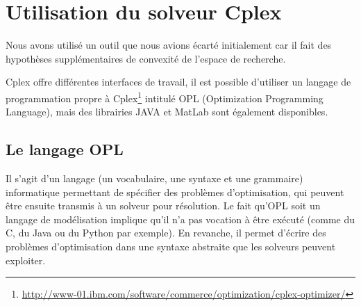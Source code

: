 											
\section[Cplex]{Utilisation du solveur Cplex}

Nous avons utilisé un outil que nous avions écarté initialement car il fait des hypothèses supplémentaires de convexité de l'espace de recherche.

Cplex offre différentes interfaces de travail, il est possible d'utiliser un langage de programmation propre à Cplex\footnote{\url{http://www-01.ibm.com/software/commerce/optimization/cplex-optimizer/}} intitulé OPL (Optimization Programming Language), mais des librairies JAVA et MatLab sont également disponibles.

\subsection{Le langage OPL}
 Il s'agit d'un langage (un vocabulaire, une syntaxe et une grammaire) informatique permettant de spécifier des problèmes d'optimisation, qui peuvent être ensuite transmis à un solveur pour résolution. Le fait qu'OPL soit un langage de modélisation implique qu'il n'a pas vocation à être exécuté (comme du C, du Java ou du Python par exemple). En revanche, il permet d'écrire
 des problèmes d'optimisation dans une syntaxe abstraite que les solveurs peuvent exploiter.
 
